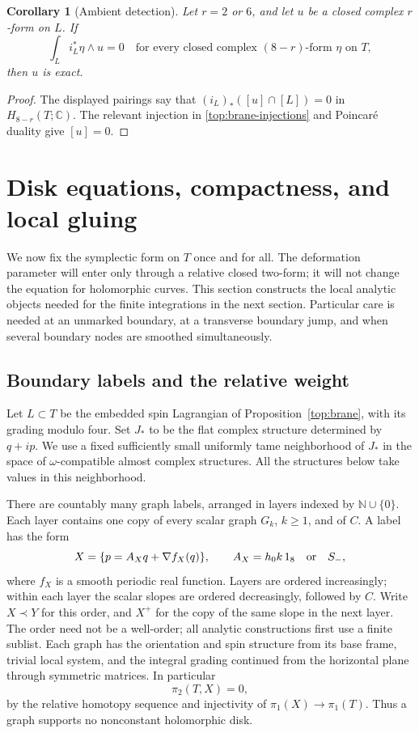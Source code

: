\documentclass[11pt]{article}
\newtheorem{corollary}[theorem]{Corollary}
\theoremstyle{definition}
\theoremstyle{remark}
\newcommand{\C}{\mathbb C}
\newcommand{\N}{\mathbb N}
\numberwithin{equation}{section}
\begin{document}
\begin{corollary}[Ambient detection]\label{top:ambient-detection}
Let $r=2$ or $6$, and let $u$ be a closed complex $r$-form on $L$.
If
\[
 \int_L i_L^*\eta\wedge u=0
 \quad\text{for every closed complex $(8-r)$-form $\eta$ on $T$},
\]
then $u$ is exact.
\end{corollary}

\begin{proof}
The displayed pairings say that
$(i_L)_*([u]\cap[L])=0$ in $H_{8-r}(T;\C)$.
The relevant injection in \eqref{top:brane-injections}
and Poincar\'e duality give $[u]=0$.
\end{proof}

\section{Disk equations, compactness, and local gluing}
\label{local:section}

We now fix the symplectic form on $T$ once and for all.  The deformation
parameter will enter only through a relative closed two-form; it will not
change the equation for holomorphic curves.  This section constructs the
local analytic objects needed for the finite integrations in the next
section.  Particular care is needed at an unmarked boundary, at a transverse
boundary jump, and when several boundary nodes are smoothed simultaneously.

\subsection{Boundary labels and the relative weight}

Let $L\subset T$ be the embedded spin Lagrangian of
Proposition~\ref{top:brane}, with its
grading modulo four.  Set $J_*$ to be the flat complex structure determined
by $q+ip$.  We use a fixed sufficiently small uniformly tame neighborhood of
$J_*$ in the space of $\omega$-compatible almost complex structures.
All the structures below take values in this neighborhood.

There are countably many graph labels, arranged in layers indexed by
$\N\cup\{0\}$.  Each layer contains one copy of every scalar graph $G_k$,
$k\geq1$, and of $C$.  A label has the form
\begin{equation}\label{local:graph}
 X=\{p=A_Xq+\nabla f_X(q)\},\qquad
 A_X=h_0k\,1_8\quad\hbox{or}\quad S_-,
\end{equation}
where $f_X$ is a smooth periodic real function.  Layers are ordered
increasingly; within each layer the scalar slopes are ordered decreasingly,
followed by $C$.  Write $X\prec Y$ for this order, and $X^+$ for the copy of
the same slope in the next layer.  The order need not be a well-order; all
analytic constructions first use a finite sublist.  Each graph has the
orientation and spin structure from its base frame, trivial local system,
and the integral grading continued from the horizontal plane through
symmetric matrices.  In particular
\[
 \pi_2(T,X)=0,
\]
by the relative homotopy sequence and injectivity of $\pi_1(X)\to\pi_1(T)$.
Thus a graph supports no nonconstant holomorphic disk.
\end{document}
